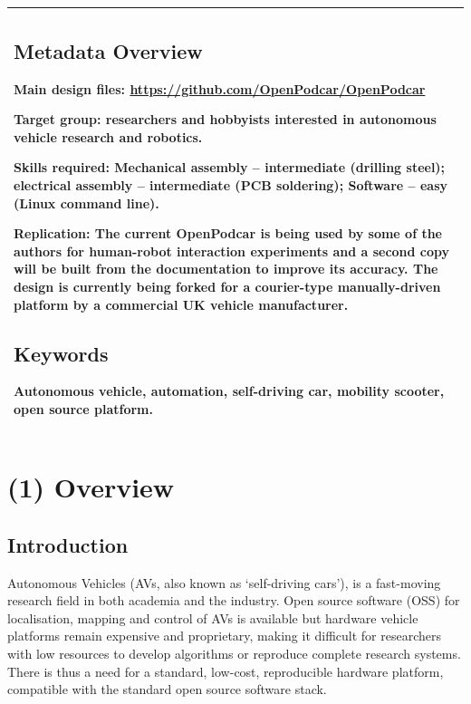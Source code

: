 \documentclass[a4paper]{article}
\begin{document}
	\begin{longtable}[]{@{}l@{}}
		\begin{minipage}[t]{0.97\columnwidth}\raggedright\strut
			
			
			\subsection*{Metadata Overview}\label{h.akaipbqoqfs8}
			
			Main design files: \url{https://github.com/OpenPodcar/OpenPodcar}
			
			Target group: researchers and hobbyists interested in autonomous vehicle research and robotics. 
			
			Skills required: Mechanical assembly – intermediate (drilling steel); electrical assembly – intermediate (PCB soldering); Software – easy (Linux command line).
			
			Replication: The current OpenPodcar is being used by some of the authors for human-robot interaction experiments and a second copy will be built from the documentation to improve its accuracy. The design is currently being forked for a courier-type manually-driven platform by a commercial UK vehicle manufacturer. 
			
			
			\subsection*{Keywords}\label{h.kdz351yp7g7c}
			
			{Autonomous vehicle, automation, self-driving car, mobility scooter, open source platform.}
			
			\strut\end{minipage}\tabularnewline
		\bottomrule
	\end{longtable}
	
	
	\section{(1) Overview}
	
	\subsection{Introduction}
	\label{h.pnj38xyr5dyy}
	
	Autonomous Vehicles (AVs, also known as `self-driving cars'), is a fast-moving research field in both academia and the industry. Open source software (OSS) for localisation, mapping and control of AVs is available \cite{kato2018autoware} but hardware vehicle platforms remain expensive and proprietary, making it difficult for researchers with low resources to develop algorithms or reproduce complete research systems. There is thus a need for a standard, low-cost, reproducible hardware platform, compatible with the standard open source software stack.
	
\end{document}
